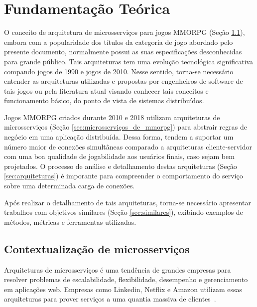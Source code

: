 \chapter{Fundamentação Teórica}
\label{cap2}

O conceito de arquitetura de microsserviços para jogos \ac{MMORPG} (Seção \ref{sec:arquitetura_de_microsserviços}), embora com a popularidade dos títulos da categoria de jogo abordado pelo presente documento, normalmente possui as suas especificações desconhecidas para grande público.
%
Tais arquiteturas tem uma evolução tecnológica significativa compando jogos de 1990 e jogos de 2010.
%
Nesse sentido, torna-se necessário entender as arquiteturas utilizadas e propostas por engenheiros de software de tais jogos ou pela literatura atual visando conhecer tais conceitos e funcionamento básico, do ponto de vista de sistemas distribuídos.



Jogos \ac{MMORPG} criados durante 2010 e 2018 utilizam arquiteturas de microsserviços (Seção \ref{sec:microsserviços_de_mmorpg}) para abstrair regras de negócio em uma aplicação distribuída.
%
Dessa forma, tendem a suportar um número maior de conexões simultâneas comparado a arquiteturas cliente-servidor com uma boa qualidade de jogabilidade aos usuários finais, caso sejam bem projetados.
%
O processo de análise e detalhamento destas arquiteturas (Seção \ref{sec:arquiteturas}) é imporante para compreender o comportamento do serviço sobre uma determinada carga de conexões.



Após realizar o detalhamento de tais arquiteturas, torna-se necessário apresentar trabalhos com objetivos similares (Seção \ref{sec:similares}),
%
exibindo exemplos de métodos, métricas e ferramentas utilizadas.



\section{Contextualização de microsserviços}
\label{sec:arquitetura_de_microsserviços}



Arquiteturas de microsserviços é uma tendência de grandes empresas para resolver problemas de escalabilidade, flexibilidade, desempenho e gerenciamento em aplicações web.
%
Empresas como Linkedin, Netflix e Amazon utilizam essas arquiteturas para prover serviços a uma quantia massiva de clientes~\cite{8169955}.



